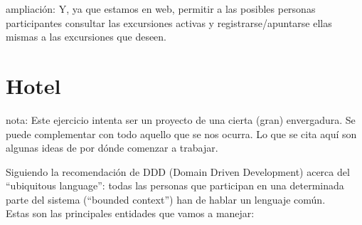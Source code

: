 \documentclass[spanish,12pt,a4paper,final,oneside]{book}
\begin{document}
ampliación: Y, ya que estamos en web, permitir a las posibles personas participantes consultar las excursiones activas y registrarse/apuntarse ellas mismas a las excursiones que deseen.



\section{Hotel}\label{ejercicio_hotel}

nota: Este ejercicio intenta ser un proyecto de una cierta (gran) envergadura. Se puede complementar con todo aquello que se nos ocurra. Lo que se cita aquí son algunas ideas de por dónde comenzar a trabajar.

\vspace{0.5cm}

Siguiendo la recomendación de DDD (Domain Driven Development) acerca del ``ubiquitous language'': todas las personas que participan en una determinada parte del sistema (``bounded context'') han de hablar un lenguaje común.
\\Estas son las principales entidades que vamos a manejar:
\end{document}
